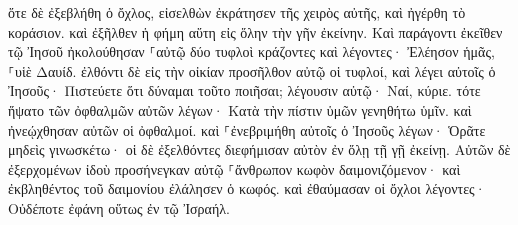 \documentclass{openreader}
\begin{document}
ὅτε δὲ ἐξεβλήθη ὁ ὄχλος, εἰσελθὼν ἐκράτησεν τῆς χειρὸς αὐτῆς, καὶ ἠγέρθη τὸ κοράσιον. 
καὶ ἐξῆλθεν ἡ φήμη αὕτη εἰς ὅλην τὴν γῆν ἐκείνην. 
Καὶ παράγοντι ἐκεῖθεν τῷ Ἰησοῦ ἠκολούθησαν ⸀αὐτῷ δύο τυφλοὶ κράζοντες καὶ λέγοντες· Ἐλέησον ἡμᾶς, ⸀υἱὲ Δαυίδ. 
ἐλθόντι δὲ εἰς τὴν οἰκίαν προσῆλθον αὐτῷ οἱ τυφλοί, καὶ λέγει αὐτοῖς ὁ Ἰησοῦς· Πιστεύετε ὅτι δύναμαι τοῦτο ποιῆσαι; λέγουσιν αὐτῷ· Ναί, κύριε. 
τότε ἥψατο τῶν ὀφθαλμῶν αὐτῶν λέγων· Κατὰ τὴν πίστιν ὑμῶν γενηθήτω ὑμῖν. 
καὶ ἠνεῴχθησαν αὐτῶν οἱ ὀφθαλμοί. καὶ ⸀ἐνεβριμήθη αὐτοῖς ὁ Ἰησοῦς λέγων· Ὁρᾶτε μηδεὶς γινωσκέτω· 
οἱ δὲ ἐξελθόντες διεφήμισαν αὐτὸν ἐν ὅλῃ τῇ γῇ ἐκείνῃ. 
Αὐτῶν δὲ ἐξερχομένων ἰδοὺ προσήνεγκαν αὐτῷ ⸀ἄνθρωπον κωφὸν δαιμονιζόμενον· 
καὶ ἐκβληθέντος τοῦ δαιμονίου ἐλάλησεν ὁ κωφός. καὶ ἐθαύμασαν οἱ ὄχλοι λέγοντες· Οὐδέποτε ἐφάνη οὕτως ἐν τῷ Ἰσραήλ. 
\end{document}
